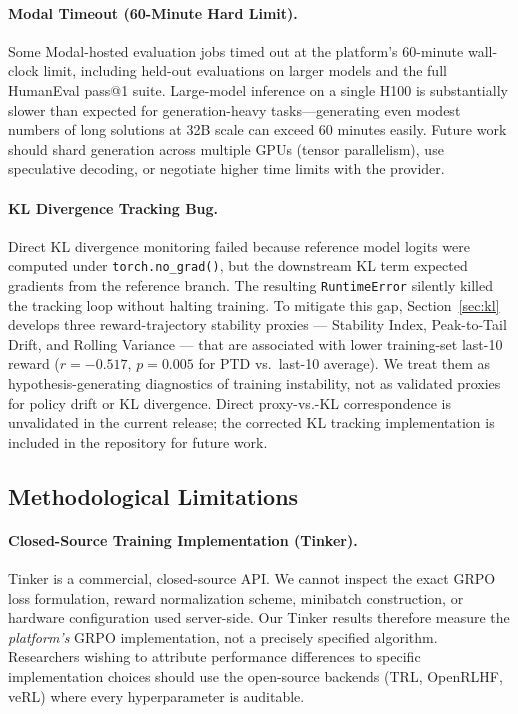 \documentclass{article}
\begin{document}
\paragraph{Modal Timeout (60-Minute Hard Limit).}
Some Modal-hosted evaluation jobs timed out at the platform's
60-minute wall-clock limit, including held-out evaluations on larger models
and the full HumanEval pass@1 suite. Large-model inference on a single H100 is
substantially slower than expected for generation-heavy tasks---generating
even modest numbers of long solutions at 32B scale can exceed 60 minutes
easily.
Future work should shard generation across multiple GPUs (tensor parallelism),
use speculative decoding, or negotiate higher time limits with the provider.

\paragraph{KL Divergence Tracking Bug.}
Direct KL divergence monitoring failed because reference model logits were
computed under \texttt{torch.no\_grad()}, but the downstream KL term expected
gradients from the reference branch. The resulting \texttt{RuntimeError}
silently killed the tracking loop without halting training.
To mitigate this gap, Section~\ref{sec:kl} develops three
reward-trajectory stability proxies --- Stability Index, Peak-to-Tail
Drift, and Rolling Variance --- that are associated with lower
training-set last-10 reward ($r = -0.517$, $p = 0.005$ for PTD vs.\
last-10 average). We treat them as hypothesis-generating diagnostics
of training instability, not as validated proxies for policy drift
or KL divergence. Direct proxy-vs.-KL correspondence is unvalidated
in the current release; the corrected KL tracking implementation is
included in the repository for future work.

\subsection{Methodological Limitations}
\label{sec:method_limits}

\paragraph{Closed-Source Training Implementation (Tinker).}
Tinker is a commercial, closed-source API. We cannot inspect the exact GRPO
loss formulation, reward normalization scheme, minibatch construction, or
hardware configuration used server-side. Our Tinker results therefore measure
the \emph{platform's} GRPO implementation, not a precisely specified algorithm.
Researchers wishing to attribute performance differences to specific
implementation choices should use the open-source backends (TRL, OpenRLHF,
veRL) where every hyperparameter is auditable.
\end{document}
